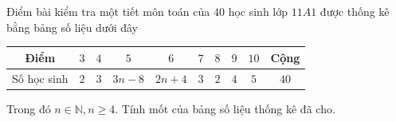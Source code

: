\begin{ex}%
	Điểm bài kiểm tra một tiết môn toán của $40$ học sinh lớp $11A1$ được thống kê bằng bảng số liệu dưới đây
	\begin{center} 
				\begin{tabular}{|c|c|c|c|c|c|c|c|c|c|} 
					\hline 
					Điểm &  $3$ &  $4$ &  $5$ &  $6$ &  $7$ &  $8$ &  $9$ &  $10$ & Cộng \\
					\hline
					Số học sinh &  $2$ &  $3$ &  $3n-8$ &  $2n+4$ &  $3$ &  $2$ &  $4$ &  $5$ & $40$ \\
					\hline  
				\end{tabular}
		\end{center}
	Trong đó $n\in \mathbb{N},n\ge 4$. Tính mốt của bảng số liệu thống kê đã cho. 
	\loigiai{
		Vì tổng các số liệu thống kê bằng $40$ nên ta có $5n+15=40\Leftrightarrow n=5$.\\ 
		Với $n=5$ ta có bảng phân bố tần số
		\begin{center} 
				\begin{tabular}{|c|c|c|c|c|c|c|c|c|c|} 
					\hline 
					Điểm &  $3$ &  $4$ &  $5$ &  $6$ &  $7$ &  $8$ &  $9$ &  $10$ & Cộng \\
					\hline
					Số học sinh &  $2$ &  $3$ &  $7$ &  $14$ &  $3$ &  $2$ &  $4$ &  $5$ & $40$ \\
					\hline  
				\end{tabular} 
		\end{center}
		Vậy mốt của bảng số liệu là $M_o=6$.
	}
\end{ex}

